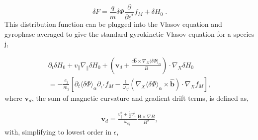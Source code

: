 \documentclass[12pt]{article}
\begin{document}
   \begin{equation}
      \delta F = \frac{q}{m}\delta\Phi\frac{\partial}{\partial\epsilon^*}f_M + \delta H_0\;.
   \end{equation}
This distribution function can be plugged into the Vlasov equation and gyrophase-averaged to give the standard gyrokinetic Vlasov
equation for a species j\cite{FriemanChen},

   \begin{equation}
   \begin{aligned}
      \partial_t\delta H_0 + v_\parallel\nabla_\parallel\delta H_0 +
      (\bm{v}_d + \frac{c\bm{\hat{b}}\times\nabla_X\langle\delta\Phi\rangle_\alpha}{B})\cdot\nabla_X\delta H_0 \\
      = 
      -\frac{e_j}{m_j}[\partial_t\langle\delta\Phi\rangle_\alpha\partial_{\epsilon^*} f_M
      -\frac{1}{\omega_{cj}}(\nabla_X\langle\delta\Phi\rangle_\alpha\times\bm{\hat{b}})\cdot\nabla_X f_M],
   \end{aligned}
   \end{equation}
where $\bm{v}_d$, the sum of magnetic curvature and gradient drift terms, is defined as,

   \begin{equation}
   \begin{aligned}
      \bm{v}_d = \frac{v_\parallel^2 + \frac{1}{2} v_\perp^2}{\omega_{cj}}\frac{\bm{B}\times\nabla B}{B^2},
   \end{aligned}
   \end{equation}
with, simplifying to lowest order in $\epsilon$,
   
\end{document}
